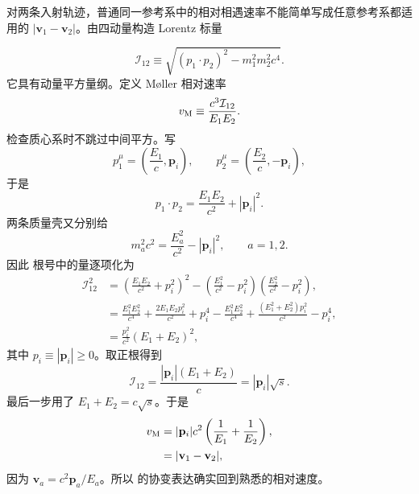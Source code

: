\begin{derivation}[不变入射通量与相遇速率]
对两条入射轨迹，普通同一参考系中的相对相遇速率不能简单写成任意参考系都适用的 $|\mathbf v_1-\mathbf v_2|$。由四动量构造 Lorentz 标量

\begin{equation*}
 \mathcal I_{12}
 \equiv\sqrt{(p_1\!\cdot p_2)^2-m_1^2m_2^2c^4}.
 \end{equation*}
它具有动量平方量纲。定义 M\o ller 相对速率
\begin{equation*}
 v_{\rm M}
 \equiv
 \frac{c^3\mathcal I_{12}}{E_1E_2}.
 \end{equation*}
检查质心系时不跳过中间平方。写
\begin{equation*}
 p_1^\mu=\left(\frac{E_1}{c},\mathbf p_i\right),
 \qquad
 p_2^\mu=\left(\frac{E_2}{c},-\mathbf p_i\right),
\end{equation*}
于是
\begin{equation*}
 p_1\!\cdot p_2=\frac{E_1E_2}{c^2}+|\mathbf p_i|^2.
\end{equation*}
两条质量壳又分别给
\begin{equation*}
 m_a^2c^2=\frac{E_a^2}{c^2}-|\mathbf p_i|^2,
 \qquad a=1,2.
\end{equation*}
因此  根号中的量逐项化为
\begin{align*}
 \mathcal I_{12}^2
 &=\left(\frac{E_1E_2}{c^2}+p_i^2\right)^2
 -\left(\frac{E_1^2}{c^2}-p_i^2\right)
  \left(\frac{E_2^2}{c^2}-p_i^2\right),\\
 &=\frac{E_1^2E_2^2}{c^4}
 +\frac{2E_1E_2p_i^2}{c^2}+p_i^4
 -\frac{E_1^2E_2^2}{c^4}
 +\frac{(E_1^2+E_2^2)p_i^2}{c^2}-p_i^4,\\
 &=\frac{p_i^2}{c^2}(E_1+E_2)^2,
\end{align*}
其中 $p_i\equiv|\mathbf p_i|\ge0$。取正根得到
\begin{equation*}
 {
 \mathcal I_{12}
 =\frac{|\mathbf p_i|(E_1+E_2)}{c}
 =|\mathbf p_i|\sqrt s.}
 \end{equation*}
最后一步用了 $E_1+E_2=c\sqrt s$。于是
\begin{align*}
 v_{\rm M}
 &=|\mathbf p_i|c^2
 \left(\frac1{E_1}+\frac1{E_2}\right),\\
 &=|\mathbf v_1-\mathbf v_2|,
\end{align*}
因为 $\mathbf v_a=c^2\mathbf p_a/E_a$。所以  的协变表达确实回到熟悉的相对速度。
\end{derivation}

